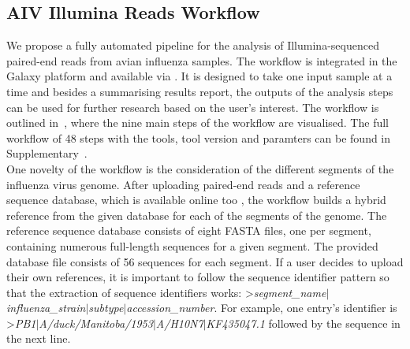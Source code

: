 \subsection{AIV Illumina Reads Workflow}\label{sec:aiv-wf}
We propose a fully automated pipeline for the analysis of Illumina-sequenced paired-end reads from avian influenza samples. The workflow is integrated in the Galaxy platform and available via . It is designed to take one input sample at a time and besides a summarising results report, the outputs of the analysis steps can be used for further research based on the user's interest. The workflow is outlined in~, where the nine main steps of the workflow are visualised. The full workflow of 48 steps with the tools, tool version and paramters can be found in Supplementary~. \\
One novelty of the workflow is the consideration of the different segments of the influenza virus genome. After uploading paired-end reads and a reference sequence database, which is available online too , the workflow builds a hybrid reference from the given database for each of the segments of the genome. The reference sequence database consists of eight FASTA files, one per segment, containing numerous full-length sequences for a given segment. The provided database file consists of 56 sequences for each segment. If a user decides to upload their own references, it is important to follow the sequence identifier pattern so that the extraction of sequence identifiers works: >\textit{segment\_name$\mid$influenza\_strain$\mid$subtype$\mid$accession\_number}. For example, one entry's identifier is >\textit{PB1$\mid$A/duck/Manitoba/1953$\mid$A/H10N7$\mid$KF435047.1} followed by the sequence in the next line. 

